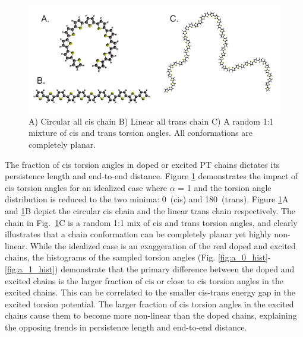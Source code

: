 \begin{figure}[hbt!]
    \centering
    \includegraphics{figures/chap2/planar_chains.pdf}
    \caption[Idealized Cis, Trans, and Mixed Chain Conformations]{A) Circular all cis chain B) Linear all trans chain C) A random 1:1 mixture of cis and trans torsion angles. All conformations are completely planar.}
    \label{fig:ideal}
\end{figure}

The fraction of cis torsion angles in doped or excited PT chains dictates its persistence length and end-to-end distance. Figure \ref{fig:ideal} demonstrates the impact of cis torsion angles for an idealized case where $\alpha$ = 1 and the torsion angle distribution is reduced to the two minima: 0\textdegree \ (cis) and 180\textdegree \ (trans). Figure \ref{fig:ideal}A and \ref{fig:ideal}B depict the circular cis chain and the linear trans chain respectively. The chain in Fig.~\ref{fig:ideal}C is a random 1:1 mix of cis and trans torsion angles, and clearly illustrates that a chain conformation can be completely planar yet highly non-linear. While the idealized case is an exaggeration of the real doped and excited chains, the histograms of the sampled torsion angles (Fig. \ref{fig:a_0_hist}-\ref{fig:a_1_hist}) demonstrate that the primary difference between the doped and excited chains is the larger fraction of cis or close to cis torsion angles in the excited chains. This can be correlated to the smaller cis-trans energy gap in the excited torsion potential. The larger fraction of cis torsion angles in the excited chains cause them to become more non-linear than the doped chains, explaining the opposing trends in persistence length and end-to-end distance.

